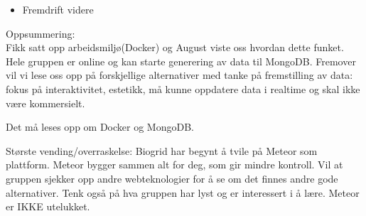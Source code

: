 \documentclass[12pt, oneside]{article}
\begin{document}
\begin{itemize}
	\item Fremdrift videre
\end{itemize}

Oppsummering:\\
Fikk satt opp arbeidsmiljø(Docker) og August viste oss hvordan dette funket. Hele gruppen er online og kan starte generering av data til MongoDB. Fremover vil vi lese oss opp på forskjellige alternativer med tanke på fremstilling av data: fokus på interaktivitet, estetikk, må kunne oppdatere data i realtime og skal ikke være kommersielt.

Det må leses opp om Docker og MongoDB.

Største vending/overraskelse: Biogrid har begynt å tvile på Meteor som plattform. Meteor bygger sammen alt for deg, som gir mindre kontroll. Vil at gruppen sjekker opp andre webteknologier for å se om det finnes andre gode alternativer. Tenk også på hva gruppen har lyst og er interessert i å lære. Meteor er IKKE utelukket. 
\end{document}
